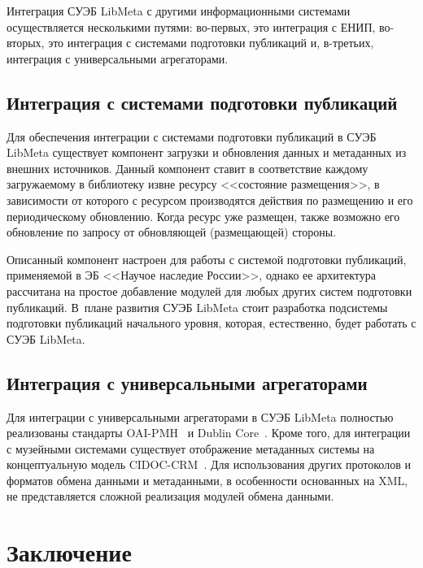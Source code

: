 \begin{multicols}{2}
  Интеграция СУЭБ LibMeta с другими информационными системами осуществляется 
несколькими путями: во-первых, это интеграция с ЕНИП, во-вторых, это интеграция с 
системами подготовки публикаций и, в-третьих, интеграция с универсальными агрегаторами.

\vspace*{-6pt}
  
  \subsection*{Интеграция с системами подготовки публикаций}
  
  Для обеспечения интеграции с системами подготовки публикаций в СУЭБ LibMeta 
существует компонент загрузки и обновления данных и метаданных из внешних источников. 
Данный компонент ставит в соответствие каждому загружаемому в библиотеку извне 
ресурсу <<состояние размещения>>, в зависимости от которого с ресурсом производятся 
действия по размещению и его периодическому обновлению. Когда ресурс уже размещен, 
также возможно его обновление по запросу от обнов\-ля\-ющей (размещающей) стороны.
  
  Описанный компонент настроен для работы с системой подготовки публикаций, 
применяемой в ЭБ <<Научое наследие России>>, однако ее архитектура рассчитана на 
простое добавление модулей для любых других систем подготовки публикаций. В~плане 
развития СУЭБ LibMeta стоит разработка подсистемы подготовки публикаций начального 
уровня, которая, естественно, будет работать с \mbox{СУЭБ} LibMeta.

  
  \subsection*{Интеграция с универсальными агрегаторами}
  
  Для интеграции с универсальными агрегаторами в СУЭБ LibMeta полностью реализованы 
стандарты OAI-PMH~\cite{22ser} и Dublin Core~\cite{11ser}. Кроме того, для интеграции с 
музейными системами существует отображение метаданных системы на концептуальную 
модель CIDOC-CRM~\cite{16ser}. Для использования других протоколов и форматов обмена 
данными и метаданными, в особенности основанных на XML, не представляется сложной 
реализация модулей обмена данными.

\vspace*{-6pt}

\section{Заключение}
  

\end{multicols}
